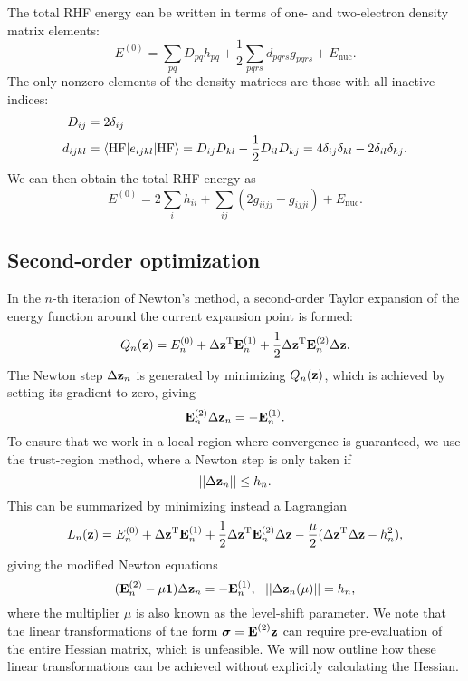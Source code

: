 \documentclass{article}
\begin{document}
The total RHF energy can be written in terms of one- and two-electron density matrix elements:
\begin{equation}
E^{(0)}=\sum_{pq}D_{pq}h_{pq}+\frac{1}{2}\sum_{pqrs}d_{pqrs}g_{pqrs}+E_{\mathrm{nuc}}.
\end{equation}
The only nonzero elements of the density matrices are those with all-inactive indices:
\begin{align}
D_{ij}&=2\delta_{ij}\\
d_{ijkl}&=\langle\mathrm{HF}|e_{ijkl}|\mathrm{HF}\rangle=D_{ij}D_{kl}-\frac{1}{2}D_{il}D_{kj}=4\delta_{ij}\delta_{kl}-2\delta_{il}\delta_{kj}.
\end{align}
We can then obtain the total RHF energy as
\begin{equation}
E^{(0)}=2\sum_ih_{ii}+\sum_{ij}(2g_{iijj}-g_{ijji})+E_{\mathrm{nuc}}.
\end{equation}

\subsection{Second-order optimization}
In the $n$-th iteration of Newton's method, a second-order Taylor expansion of the energy function around the current expansion point is formed:
\begin{equation}
Q_n(\bm{\mathrm{z}})=E_n^{(0)}+\Delta\bm{\mathrm{z}}^{\text{T}}\bm{\mathrm{E}}_n^{(1)}+\frac{1}{2}\Delta\bm{\mathrm{z}}^{\text{T}}\bm{\mathrm{E}}_n^{(2)}\Delta\bm{\mathrm{z}}.
\end{equation}
The Newton step $\Delta\bm{\mathrm{z}}_n$ is generated by minimizing $Q_n(\bm{\mathrm{z}})$, which is achieved by setting its gradient to zero, giving
\begin{equation}
\bm{\mathrm{E}}_n^{(2)}\Delta\bm{\mathrm{z}}_n=-\bm{\mathrm{E}}_n^{(1)}.
\end{equation}
To ensure that we work in a local region where convergence is guaranteed, we use the trust-region method, where a Newton step is only taken if
\begin{equation}
||\Delta\bm{\mathrm{z}}_n||\leq h_n.
\end{equation}
This can be summarized by minimizing instead a Lagrangian
\begin{equation}
L_n(\bm{\mathrm{z}})=E_n^{(0)}+\Delta\bm{\mathrm{z}}^{\text{T}}\bm{\mathrm{E}}_n^{(1)}+\frac{1}{2}\Delta\bm{\mathrm{z}}^{\text{T}}\bm{\mathrm{E}}_n^{(2)}\Delta\bm{\mathrm{z}}-\frac{\mu}{2}(\Delta\bm{\mathrm{z}}^{\text{T}}\Delta\bm{\mathrm{z}}-h_n^2),
\end{equation}
giving the modified Newton equations
\begin{equation}
(\bvec{E}_n^{(2)}-\mu\bvec{1})\Delta\bvec{z}_n=-\bvec{E}_n^{(1)},\ \ ||\Delta\bvec{z}_n(\mu)||= h_n,
\end{equation}
where the multiplier $\mu$ is also known as the level-shift parameter. We note that the linear transformations of the form $\bm{\mathrm{\sigma}}=\bm{\mathrm{E}}^{(2)}\bm{\mathrm{z}}$ can require pre-evaluation of the entire Hessian matrix, which is unfeasible. We will now outline how these linear transformations can be achieved without explicitly calculating the Hessian.
\end{document}
